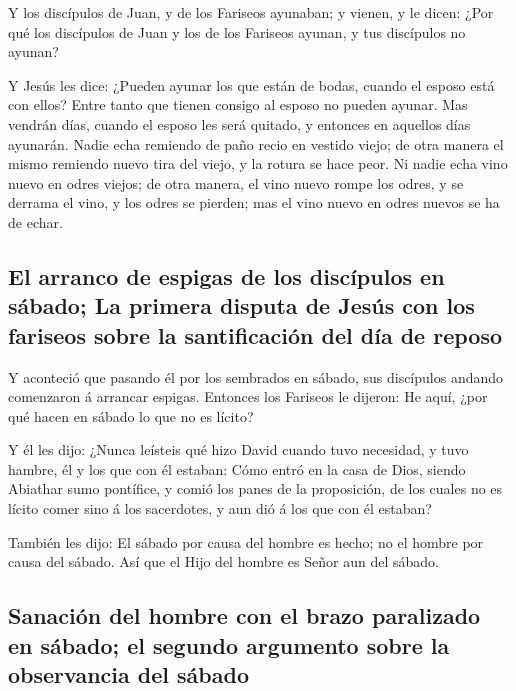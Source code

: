  Y los discípulos de Juan, y de los Fariseos ayunaban; y
vienen, y le dicen: ¿Por qué los discípulos de Juan y los de los
Fariseos ayunan, y tus discípulos no ayunan?

 Y Jesús les dice: ¿Pueden ayunar los que están de bodas,
cuando el esposo está con ellos? Entre tanto que tienen consigo al
esposo no pueden ayunar.  Mas vendrán días, cuando el
esposo les será quitado, y entonces en aquellos días ayunarán.
 Nadie echa remiendo de paño recio en vestido viejo; de
otra manera el mismo remiendo nuevo tira del viejo, y la rotura se hace
peor.  Ni nadie echa vino nuevo en odres viejos; de otra
manera, el vino nuevo rompe los odres, y se derrama el vino, y los odres
se pierden; mas el vino nuevo en odres nuevos se ha de echar.

\hypertarget{el-arranco-de-espigas-de-los-discuxedpulos-en-suxe1bado-la-primera-disputa-de-jesuxfas-con-los-fariseos-sobre-la-santificaciuxf3n-del-duxeda-de-reposo}{%
\subsection{El arranco de espigas de los discípulos en sábado; La
primera disputa de Jesús con los fariseos sobre la santificación del día
de
reposo}\label{el-arranco-de-espigas-de-los-discuxedpulos-en-suxe1bado-la-primera-disputa-de-jesuxfas-con-los-fariseos-sobre-la-santificaciuxf3n-del-duxeda-de-reposo}}

 Y aconteció que pasando él por los sembrados en sábado,
sus discípulos andando comenzaron á arrancar espigas. 
Entonces los Fariseos le dijeron: He aquí, ¿por qué hacen en sábado lo
que no es lícito?

 Y él les dijo: ¿Nunca leísteis qué hizo David cuando
tuvo necesidad, y tuvo hambre, él y los que con él estaban:
 Cómo entró en la casa de Dios, siendo Abiathar sumo
pontífice, y comió los panes de la proposición, de los cuales no es
lícito comer sino á los sacerdotes, y aun dió á los que con él estaban?

 También les dijo: El sábado por causa del hombre es
hecho; no el hombre por causa del sábado.  Así que el
Hijo del hombre es Señor aun del sábado.

\hypertarget{sanaciuxf3n-del-hombre-con-el-brazo-paralizado-en-suxe1bado-el-segundo-argumento-sobre-la-observancia-del-suxe1bado}{%
\subsection{Sanación del hombre con el brazo paralizado en sábado; el
segundo argumento sobre la observancia del
sábado}\label{sanaciuxf3n-del-hombre-con-el-brazo-paralizado-en-suxe1bado-el-segundo-argumento-sobre-la-observancia-del-suxe1bado}}

